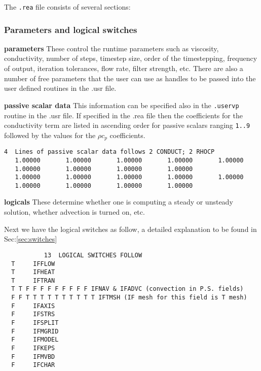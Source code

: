 
The {\tt .rea} file consists of several sections:
\subsubsection*{ Parameters and logical switches}
\begin{description}
\item{\bf parameters} These control the runtime parameters such as viscosity,
    conductivity, number of steps, timestep size, order of the timestepping,
    frequency of output, iteration tolerances, flow rate, filter strength,
    etc.   There are also a number of free parameters that the user can
    use as handles to be passed into the user defined routines in the .usr file.
\item{\bf passive scalar data} This information can be specified also in the \texttt{.uservp} routine in the .usr file. If specified in the .rea file then the coefficients for the conductivity term are listed in ascending order for passive scalars ranging \texttt{1..9} followed by the values for the \(\rho c_p\) coefficients.
\begin{verbatim}
4  Lines of passive scalar data follows 2 CONDUCT; 2 RHOCP
   1.00000       1.00000       1.00000       1.00000       1.00000
   1.00000       1.00000       1.00000       1.00000
   1.00000       1.00000       1.00000       1.00000       1.00000
   1.00000       1.00000       1.00000       1.00000
\end{verbatim}
\item{\bf logicals} These determine whether one is computing a steady or unsteady
  solution, whether advection is turned on, etc.
\end{description}

Next we have the logical switches as follow, a detailed explanation to be found in Sec:\ref{sec:switches}
\begin{verbatim}
           13  LOGICAL SWITCHES FOLLOW
  T     IFFLOW
  T     IFHEAT
  T     IFTRAN
  T T F F F F F F F F F IFNAV & IFADVC (convection in P.S. fields)
  F F T T T T T T T T T T IFTMSH (IF mesh for this field is T mesh)
  F     IFAXIS
  F     IFSTRS
  F     IFSPLIT
  F     IFMGRID
  F     IFMODEL
  F     IFKEPS
  F     IFMVBD
  F     IFCHAR
\end{verbatim}

